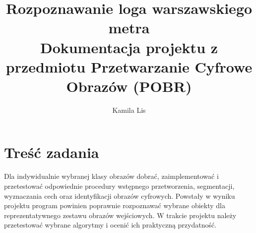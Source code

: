 \documentclass{article}
\date{}
\author{Kamila Lis}
\title{Rozpoznawanie loga warszawskiego metra\\
	{\large Dokumentacja projektu z przedmiotu Przetwarzanie Cyfrowe Obrazów (POBR)}}
\begin{document}
	\maketitle

\section{Treść zadania}
Dla indywidualnie wybranej klasy obrazów dobrać, zaimplementować i przetestować odpowiednie procedury wstępnego przetworzenia, segmentacji, wyznaczania cech oraz identyfikacji obrazów cyfrowych. Powstały w wyniku projektu program powinien poprawnie rozpoznawać wybrane obiekty dla reprezentatywnego zestawu obrazów wejściowych. W trakcie projektu należy przetestować wybrane algorytmy i ocenić ich praktyczną przydatność.
\end{document}
